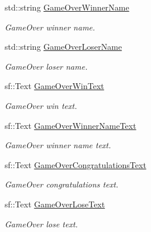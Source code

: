 \begin{DoxyCompactItemize}
std\+::string \hyperlink{class_scene_af3c1d7ed4dfa6d441fe40cffb413eb24}{Game\+Over\+Winner\+Name}
\begin{DoxyCompactList}\small\item\em Game\+Over winner name. \end{DoxyCompactList}\item 
\mbox{\label{class_scene_a02adffe1edcd7b14435e1876b95e529e}} 
std\+::string \hyperlink{class_scene_a02adffe1edcd7b14435e1876b95e529e}{Game\+Over\+Loser\+Name}
\begin{DoxyCompactList}\small\item\em Game\+Over loser name. \end{DoxyCompactList}\item 
\mbox{\label{class_scene_a98ad3f69554feb8b98832b61e921aacd}} 
sf\+::\+Text \hyperlink{class_scene_a98ad3f69554feb8b98832b61e921aacd}{Game\+Over\+Win\+Text}
\begin{DoxyCompactList}\small\item\em Game\+Over win text. \end{DoxyCompactList}\item 
\mbox{\label{class_scene_ac188fb7e7b2231a2d5fdc9a694258659}} 
sf\+::\+Text \hyperlink{class_scene_ac188fb7e7b2231a2d5fdc9a694258659}{Game\+Over\+Winner\+Name\+Text}
\begin{DoxyCompactList}\small\item\em Game\+Over winner name text. \end{DoxyCompactList}\item 
\mbox{\label{class_scene_a44744105b4bcffdb246defaa8ccc8bb1}} 
sf\+::\+Text \hyperlink{class_scene_a44744105b4bcffdb246defaa8ccc8bb1}{Game\+Over\+Congratulations\+Text}
\begin{DoxyCompactList}\small\item\em Game\+Over congratulations text. \end{DoxyCompactList}\item 
\mbox{\label{class_scene_a5ae0a07930648e894ae5ad08b0a508bf}} 
sf\+::\+Text \hyperlink{class_scene_a5ae0a07930648e894ae5ad08b0a508bf}{Game\+Over\+Lose\+Text}
\begin{DoxyCompactList}\small\item\em Game\+Over lose text. \end{DoxyCompactList}\item 

\end{DoxyCompactItemize}
